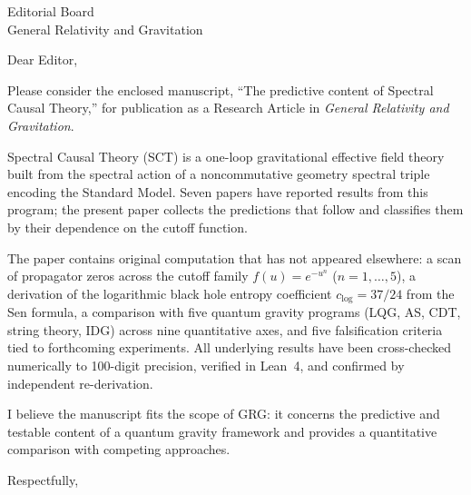 \documentclass[12pt]{letter}
\begin{document}
\begin{letter}{Editorial Board\\General Relativity and Gravitation}

\opening{Dear Editor,}

Please consider the enclosed manuscript, ``The predictive content
of Spectral Causal Theory,'' for publication as a Research Article
in \textit{General Relativity and Gravitation}.

Spectral Causal Theory (SCT) is a one-loop gravitational effective
field theory built from the spectral action of a noncommutative
geometry spectral triple encoding the Standard Model.  Seven papers
have reported results from this program; the present paper collects
the predictions that follow and classifies them by their dependence
on the cutoff function.

The paper contains original computation that has not appeared
elsewhere: a scan of propagator zeros across the cutoff family
$f(u)=e^{-u^n}$ ($n=1,\dots,5$), a derivation of the logarithmic
black hole entropy coefficient $c_{\log}=37/24$ from the Sen
formula, a comparison with five quantum gravity programs (LQG, AS,
CDT, string theory, IDG) across nine quantitative axes, and five
falsification criteria tied to forthcoming experiments.  All
underlying results have been cross-checked numerically to 100-digit
precision, verified in Lean~4, and confirmed by independent
re-derivation.

I believe the manuscript fits the scope of GRG: it concerns the
predictive and testable content of a quantum gravity framework and
provides a quantitative comparison with competing approaches.

\closing{Respectfully,}

\end{letter}
\end{document}
